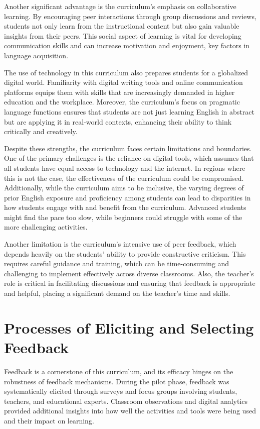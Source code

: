 \documentclass[11pt]{article}
\begin{document}
Another significant advantage is the curriculum's emphasis on collaborative learning. By encouraging peer interactions through group discussions and reviews, students not only learn from the instructional content but also gain valuable insights from their peers. This social aspect of learning is vital for developing communication skills and can increase motivation and enjoyment, key factors in language acquisition.

The use of technology in this curriculum also prepares students for a globalized digital world. Familiarity with digital writing tools and online communication platforms equips them with skills that are increasingly demanded in higher education and the workplace. Moreover, the curriculum's focus on pragmatic language functions ensures that students are not just learning English in abstract but are applying it in real-world contexts, enhancing their ability to think critically and creatively.

Despite these strengths, the curriculum faces certain limitations and boundaries. One of the primary challenges is the reliance on digital tools, which assumes that all students have equal access to technology and the internet. In regions where this is not the case, the effectiveness of the curriculum could be compromised. Additionally, while the curriculum aims to be inclusive, the varying degrees of prior English exposure and proficiency among students can lead to disparities in how students engage with and benefit from the curriculum. Advanced students might find the pace too slow, while beginners could struggle with some of the more challenging activities.

Another limitation is the curriculum’s intensive use of peer feedback, which depends heavily on the students' ability to provide constructive criticism. This requires careful guidance and training, which can be time-consuming and challenging to implement effectively across diverse classrooms. Also, the teacher’s role is critical in facilitating discussions and ensuring that feedback is appropriate and helpful, placing a significant demand on the teacher’s time and skills.

\section{Processes of Eliciting and Selecting Feedback}

Feedback is a cornerstone of this curriculum, and its efficacy hinges on the robustness of feedback mechanisms. During the pilot phase, feedback was systematically elicited through surveys and focus groups involving students, teachers, and educational experts. Classroom observations and digital analytics provided additional insights into how well the activities and tools were being used and their impact on learning.
\end{document}
